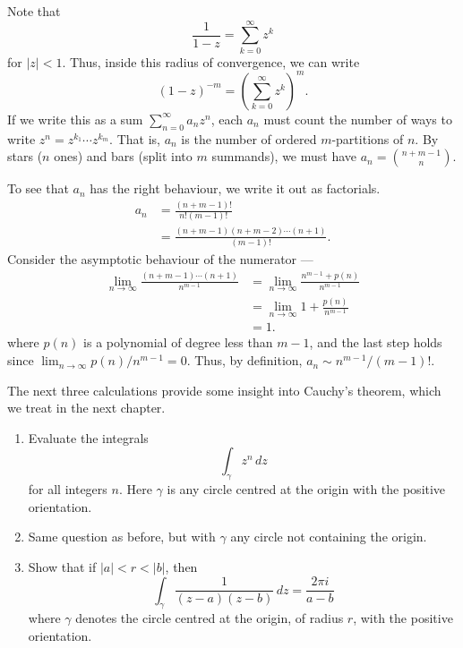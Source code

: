 \documentclass[12 pt, letterpaper]{hmcpset}
\begin{document}
\begin{solution}
	Note that
	\[
		\frac{1}{1 - z} = \sum_{k = 0}^{\infty} z^{k}
	\]
	for $\lvert z \rvert < 1$. Thus, inside this radius of convergence, we can write
	\[
		(1 - z)^{-m} = \left ( \sum_{k = 0}^{\infty} z^{k} \right )^{m}.
	\]
	If we write this as a sum $\sum_{n = 0}^{\infty} a_{n} z^{n}$, each $a_{n}$ must count the number of ways to write $z^{n} = z^{k_{1}} \cdots z^{k_{m}}$. That is, $a_{n}$ is the number of ordered $m$-partitions of $n$. By stars ($n$ ones) and bars (split into $m$ summands), we must have $a_{n} = \binom{n + m - 1}{n}$.

	To see that $a_{n}$ has the right behaviour, we write it out as factorials.
	\[
		\begin{split}
			a_{n} & = \frac{(n + m - 1)!}{n! (m - 1)!} \\
			      & = \frac{(n + m - 1) (n + m - 2) \cdots (n + 1)}{(m - 1)!}.
		\end{split}
	\]
	Consider the asymptotic behaviour of the numerator ---
	\[
		\begin{split}
			\lim_{n \to \infty} \frac{(n + m - 1) \cdots (n + 1)}{n^{m - 1}} & = \lim_{n \to \infty} \frac{n^{m - 1} + p(n)}{n^{m - 1}} \\
											 & = \lim_{n \to \infty} 1 + \frac{p(n)}{n^{m - 1}} \\
											 & = 1.
		\end{split}
	\]
	where $p(n)$ is a polynomial of degree less than $m - 1$, and the last step holds since $\lim_{n \to \infty} p(n)/n^{m - 1} = 0$. Thus, by definition, $a_{n} \sim n^{m - 1} / (m - 1)!$.
\end{solution}

\pagebreak

\begin{problem}[25.]
	The next three calculations provide some insight into Cauchy's theorem, which we treat in the next chapter.
	\begin{enumerate}
		\item Evaluate the integrals
			\[
				\int_{\gamma} z^{n} \, dz 
			\]
			for all integers $n$. Here $\gamma$ is any circle centred at the origin with the positive orientation.
		\item Same question as before, but with $\gamma$ any circle not containing the origin.
		\item Show that if $\lvert a \rvert < r < \lvert b \rvert$, then
			\[
				\int_{\gamma} \frac{1}{(z - a)(z - b)} \, dz = \frac{2 \pi i}{a - b}
			\]
			where $\gamma$ denotes the circle centred at the origin, of radius $r$, with the positive orientation.
	\end{enumerate}
\end{problem}
\end{document}
